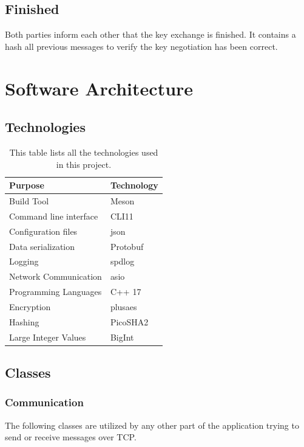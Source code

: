 \documentclass[12pt, letterpaper]{article}
\begin{document}
\subsection*{Finished}
Both parties inform each other that the key exchange is finished. It contains a hash all previous messages to verify the key negotiation has been correct.

\section{Software Architecture}

\subsection{Technologies}

\begin{table}[h]
	\centering
	\begin{tabular}{l|l}
		Purpose                       & Technology \\ \hline
		Build Tool				 	  & Meson	   \\
		Command line interface	      & CLI11      \\
		Configuration files           & json       \\
		Data serialization            & Protobuf   \\
		Logging                       & spdlog     \\
		Network Communication         & asio       \\
		Programming Languages		  & C++ 17 \\
		Encryption 					& plusaes \\
		Hashing 					& PicoSHA2 \\
		Large Integer Values & BigInt \\
	\end{tabular}
	\caption{This table lists all the technologies used in this project.}
\end{table}

\subsection{Classes}

\subsubsection{Communication}
The following classes are utilized by any other part of the application trying to send or receive messages over TCP.
\end{document}
